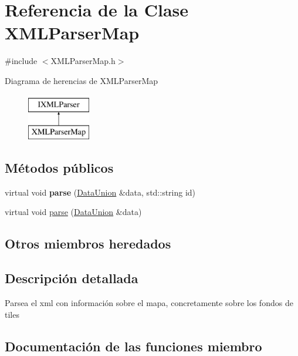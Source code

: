 \hypertarget{classXMLParserMap}{}\section{Referencia de la Clase X\+M\+L\+Parser\+Map}
\label{classXMLParserMap}


{\ttfamily \#include $<$X\+M\+L\+Parser\+Map.\+h$>$}

Diagrama de herencias de X\+M\+L\+Parser\+Map\begin{figure}[H]
\begin{center}
\leavevmode
\includegraphics[height=2.000000cm]{classXMLParserMap}
\end{center}
\end{figure}
\subsection*{Métodos públicos}
\begin{DoxyCompactItemize}
\item 
\hypertarget{classXMLParserMap_a6cc6fb4afc0af221ce91121796cbee92}{}virtual void {\bfseries parse} (\hyperlink{unionDataUnion}{Data\+Union} \&data, std\+::string id)\label{classXMLParserMap_a6cc6fb4afc0af221ce91121796cbee92}

\item 
virtual void \hyperlink{classXMLParserMap_a428974998d952d3d8a84db0b02176765}{parse} (\hyperlink{unionDataUnion}{Data\+Union} \&data)
\end{DoxyCompactItemize}
\subsection*{Otros miembros heredados}


\subsection{Descripción detallada}
Parsea el xml con información sobre el mapa, concretamente sobre los fondos de tiles 

\subsection{Documentación de las funciones miembro}
\hypertarget{classXMLParserMap_a428974998d952d3d8a84db0b02176765}{}
